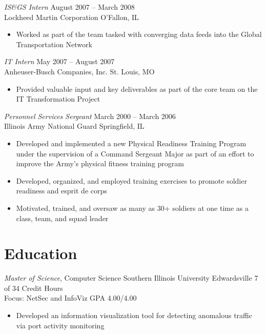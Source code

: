 \documentclass[margin,line]{resume}
\begin{document}
\begin{resume}
\begin{itemize}
\end{itemize}

{\sl IS\&GS Intern}                 \hfill  August 2007 -- March 2008\\
Lockheed Martin Corporation         \hfill  O'Fallon, IL
\begin{itemize} \itemsep -2pt %
\small\item Worked as part of the team tasked with converging data feeds into the Global Transportation Network
\end{itemize}

{\sl IT Intern}                     \hfill  May 2007 -- August 2007\\
Anheuser-Busch Companies, Inc.      \hfill  St. Louis, MO
\begin{itemize} \itemsep -2pt %
\small\item Provided valuable input and key deliverables as part of the core team on the IT Transformation Project
\end{itemize}

{\sl Personnel Services Sergeant}   \hfill   March 2000 -- March 2006\\
Illinois Army National Guard        \hfill   Springfield, IL
\begin{itemize} \itemsep -2pt %
\small\item Developed and implemented a new Physical Readiness Training Program under the supervision of a
            Command Sergeant Major as part of an effort to improve the Army's physical fitness training program
\small\item Developed, organized, and employed training exercises to promote soldier readiness and esprit de corps
\small\item Motivated, trained, and oversaw as many as 30+ soldiers at one time as a class, team, and squad leader
\end{itemize}

\section{Education}
{\small
  {\sl Master of Science}, Computer Science \hfill
  Southern Illinois University Edwardsville \hfill
  7 of 34 Credit Hours\\
  Focus: NetSec and InfoViz \hfill
  GPA 4.00/4.00
}
\begin{itemize} \itemsep -2pt %
\small\item[] Developed an information visualization tool for detecting anomalous traffic via port activity monitoring
\end{itemize}


\end{resume}
\end{document}
